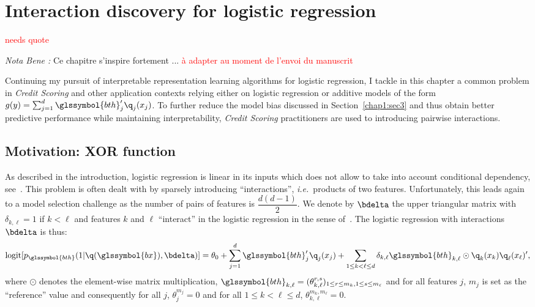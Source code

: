 \chapter{Interaction discovery for logistic regression} \label{chap5}

\minitoc


\textcolor{red}{needs quote}

\textit{Nota Bene :} Ce chapitre s'inspire fortement ... \textcolor{red}{à adapter au moment de l'envoi du manuscrit}

\bigskip


Continuing my pursuit of interpretable representation learning algorithms for logistic regression, I tackle in this chapter a common problem in \textit{Credit Scoring} and other application contexts relying either on logistic regression or additive models of the form $g(y) = \sum_{j=1}^d \glssymbol{bth}_j' \q_j(x_j)$. To further reduce the model bias discussed in Section~\ref{chap1:sec3} and thus obtain better predictive performance while maintaining interpretability, \textit{Credit Scoring} practitioners are used to introducing pairwise interactions.


\section{Motivation: XOR function}

As described in the introduction, logistic regression is linear in its inputs which does not allow to take into account conditional dependency, see~\cite{berry2010testing}. This problem is often dealt with by sparsely introducing ``interactions'', \textit{i.e.}\ products of two features. Unfortunately, this leads again to a model selection challenge as the number of pairs of features is $\dfrac{d(d-1)}{2}$. We denote by $\bdelta$ the upper triangular matrix with $\delta_{k,\ell} = 1$ if $k < \ell$ and features $k$ and $\ell$ ``interact'' in the logistic regression in the sense of~\cite{berry2010testing}. The logistic regression with interactions $\bdelta$ is thus:
\begin{equation} \label{eq:reglog_sans}
\text{logit}[p_{\glssymbol{bth}}(1|\q(\glssymbol{bx}),\bdelta)] = \theta_{0} + \sum_{j=1}^d \glssymbol{bth}_j' \q_j(x_j) + \sum_{1 \leq k < \ell \leq d} \delta_{k,\ell} \glssymbol{bth}_{k,\ell} \odot \q_k(x_k) \q_\ell(x_\ell)',
\end{equation}
where $\odot$ denotes the element-wise matrix multiplication, $\glssymbol{bth}_{k,\ell} = (\theta_{k,\ell}^{r,s})_{1 \leq r \leq m_k, 1 \leq s \leq m_\ell}$ and for all features $j$, $m_j$ is set as the ``reference'' value and consequently for all $j$, $\theta_{j}^{m_j}=0$ and for all $1 \leq k < \ell \leq d$, $\theta_{k,\ell}^{m_k,m_{\ell}}=0$.

